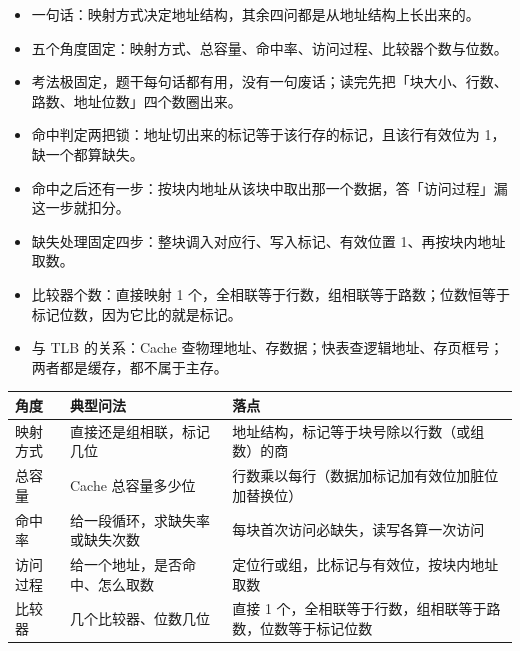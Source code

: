 \documentclass[10pt,a4paper]{ctexart}
\begin{document}
\begin{itemize}

\item 一句话：映射方式决定地址结构，其余四问都是从地址结构上长出来的。

\item 五个角度固定：映射方式、总容量、命中率、访问过程、比较器个数与位数。

\item 考法极固定，题干每句话都有用，没有一句废话；读完先把「块大小、行数、路数、地址位数」四个数圈出来。

\item 命中判定两把锁：地址切出来的标记等于该行存的标记，且该行有效位为 1，缺一个都算缺失。

\item 命中之后还有一步：按块内地址从该块中取出那一个数据，答「访问过程」漏这一步就扣分。

\item 缺失处理固定四步：整块调入对应行、写入标记、有效位置 1、再按块内地址取数。

\item 比较器个数：直接映射 1 个，全相联等于行数，组相联等于路数；位数恒等于标记位数，因为它比的就是标记。

\item 与 TLB 的关系：Cache 查物理地址、存数据；快表查逻辑地址、存页框号；两者都是缓存，都不属于主存。

\end{itemize}

\begin{center}\small
\begin{tabularx}{\linewidth}{@{}l>{\raggedright\arraybackslash}X>{\raggedright\arraybackslash}X@{}}
\toprule
角度 & 典型问法 & 落点 \\
\midrule
映射方式 & 直接还是组相联，标记几位 & 地址结构，标记等于块号除以行数（或组数）的商 \\
总容量 & Cache 总容量多少位 & 行数乘以每行（数据加标记加有效位加脏位加替换位） \\
命中率 & 给一段循环，求缺失率或缺失次数 & 每块首次访问必缺失，读写各算一次访问 \\
访问过程 & 给一个地址，是否命中、怎么取数 & 定位行或组，比标记与有效位，按块内地址取数 \\
比较器 & 几个比较器、位数几位 & 直接 1 个，全相联等于行数，组相联等于路数，位数等于标记位数 \\
\bottomrule
\end{tabularx}
\end{center}
\end{document}
